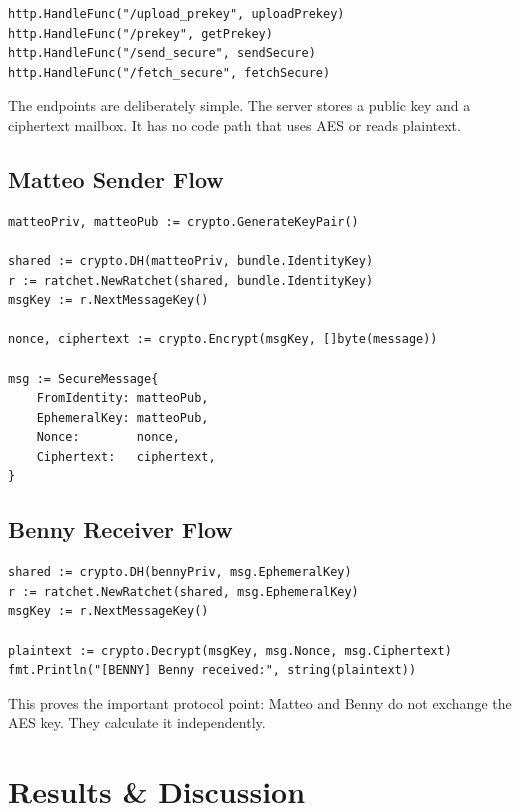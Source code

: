 \documentclass[12pt,a4paper]{article}
\begin{document}
\begin{lstlisting}[style=code, caption={HTTP route setup in server/main.go}]
http.HandleFunc("/upload_prekey", uploadPrekey)
http.HandleFunc("/prekey", getPrekey)
http.HandleFunc("/send_secure", sendSecure)
http.HandleFunc("/fetch_secure", fetchSecure)
\end{lstlisting}

The endpoints are deliberately simple. The server stores a public key and a ciphertext mailbox. It has no code path that uses AES or reads plaintext.

\subsection{Matteo Sender Flow}

\begin{lstlisting}[style=code, caption={Matteo derives a key and encrypts in matteo/main.go}]
matteoPriv, matteoPub := crypto.GenerateKeyPair()

shared := crypto.DH(matteoPriv, bundle.IdentityKey)
r := ratchet.NewRatchet(shared, bundle.IdentityKey)
msgKey := r.NextMessageKey()

nonce, ciphertext := crypto.Encrypt(msgKey, []byte(message))

msg := SecureMessage{
    FromIdentity: matteoPub,
    EphemeralKey: matteoPub,
    Nonce:        nonce,
    Ciphertext:   ciphertext,
}
\end{lstlisting}

\subsection{Benny Receiver Flow}

\begin{lstlisting}[style=code, caption={Benny derives the same key and decrypts in benny/main.go}]
shared := crypto.DH(bennyPriv, msg.EphemeralKey)
r := ratchet.NewRatchet(shared, msg.EphemeralKey)
msgKey := r.NextMessageKey()

plaintext := crypto.Decrypt(msgKey, msg.Nonce, msg.Ciphertext)
fmt.Println("[BENNY] Benny received:", string(plaintext))
\end{lstlisting}

This proves the important protocol point: Matteo and Benny do not exchange the AES key. They calculate it independently.

\section{Results \& Discussion}
\end{document}
